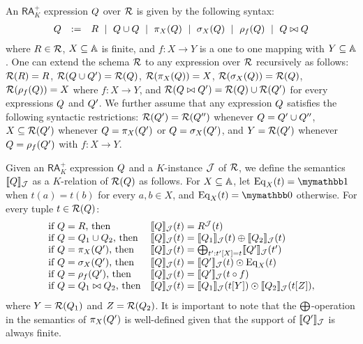 An $\mathsf{RA}_{K}^+$  expression $Q$ over $\mathcal{R}$ is given by the following syntax:
$$
\begin{array}{rcl}
Q & := & R \ \mid \ Q \cup Q \ \mid \  \pi_X(Q) \ \mid \  \sigma_X(Q) \ \mid \ \rho_f(Q) \ \mid \ Q \bowtie Q
\end{array}
$$
where $R \in \mathcal{R}$, $X \subseteq \mathbb{A}$ is finite, and $f: X \rightarrow Y$ is a one to one mapping with $Y \subseteq \mathbb{A}$. One can extend the schema $\mathcal{R}$ to any expression over $\mathcal{R}$ recursively as follows: $\mathcal{R}(R) = R$, $\mathcal{R}(Q \cup Q') = \mathcal{R}(Q)$, $\mathcal{R}(\pi_X(Q)) = X$, $\mathcal{R}(\sigma_X(Q)) = \mathcal{R}(Q)$, $\mathcal{R}(\rho_f(Q)) = X$ where $f:X \rightarrow Y$, and $\mathcal{R}(Q \bowtie Q') = \mathcal{R}(Q) \cup \mathcal{R}(Q')$ for every expressions $Q$ and $Q'$.
We further assume that any expression $Q$ satisfies the following syntactic restrictions: $\mathcal{R}(Q') = \mathcal{R}(Q'')$ whenever $Q = Q' \cup Q''$, $X \subseteq \mathcal{R}(Q')$ whenever $Q = \pi_X(Q')$ or $Q = \sigma_X(Q')$, and $Y = \mathcal{R}(Q')$ whenever $Q = \rho_f(Q')$ with $f: X \rightarrow Y$.

Given an $\mathsf{RA}_{K}^+$ expression $Q$ and a $K$-instance $\mathcal{J}$ of $\mathcal{R}$, we define the semantics $\llbracket Q \rrbracket_{\mathcal{J}}$ as a $K$-relation of $\mathcal{R}(Q)$ as follows. For $X \subseteq \mathbb{A}$, let $\operatorname{Eq}_X(t) = \kone$ when $t(a) = t(b)$ for every $a, b \in X$, and $\operatorname{Eq}_X(t) = \kzero$ otherwise. For every tuple $t \in \mathcal{R}(Q)$:
$$
\begin{array}{ll}
\text{if $Q = R$, then} & \llbracket Q \rrbracket_{\mathcal{J}}(t) = R^{\mathcal{J}}(t) \\
\text{if $Q = Q_1 \cup Q_2$, then} & \llbracket Q \rrbracket_{\mathcal{J}}(t) = \llbracket Q_1 \rrbracket_{\mathcal{J}}(t) \oplus \llbracket Q_2 \rrbracket_{\mathcal{J}}(t)  \\
\text{if $Q = \pi_X(Q')$, then} & \llbracket Q \rrbracket_{\mathcal{J}}(t) = \bigoplus_{t': t'[X] = t} \llbracket Q' \rrbracket_{\mathcal{J}}(t') \\
\text{if $Q = \sigma_X(Q')$, then} & \llbracket Q \rrbracket_{\mathcal{J}}(t) = 
\llbracket Q' \rrbracket_{\mathcal{J}}(t) \odot \operatorname{Eq}_X(t)  \\
\text{if $Q = \rho_f(Q')$, then} & \llbracket Q \rrbracket_{\mathcal{J}}(t) = 
\llbracket Q' \rrbracket_{\mathcal{J}}(t \circ f)  
\\
\text{if $Q = Q_1 \bowtie Q_2$, then} & \llbracket Q \rrbracket_{\mathcal{J}}(t) =  \llbracket Q_1 \rrbracket_{\mathcal{J}}(t[Y]) \odot  \llbracket Q_2 \rrbracket_{\mathcal{J}}(t[Z]),
\end{array}
$$
where $Y = \mathcal{R}(Q_1)$ and $Z = \mathcal{R}(Q_2)$. It is important to note that the $\bigoplus$-operation in the semantics of $\pi_X(Q')$ is well-defined given that the support of $\llbracket Q' \rrbracket_{\mathcal{J}}$ is always finite. 

